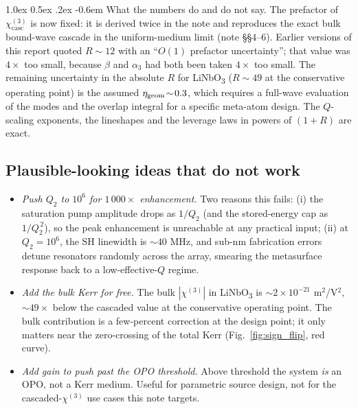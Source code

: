 \documentclass[11pt,a4paper]{article}
\makeatletter
\newcommand{\chithree}{\chi^{(3)}}
\newcommand{\geom}{{\rm geom}}
\renewcommand\paragraph{%
  \@startsection{paragraph}{4}{\z@}%
                {1.0ex \@plus 0.5ex \@minus .2ex}%
                {-0.6em}%
                {\normalfont\itshape}}
\makeatother
\begin{document}
\paragraph{What the numbers do and do not say.}
The prefactor of $\chithree_\text{casc}$ is now fixed: it is derived
twice in the note and reproduces the exact bulk bound-wave cascade in
the uniform-medium limit (note \S\S4--6).  Earlier versions of this
report quoted $R\!\sim\!12$ with an ``$O(1)$ prefactor uncertainty'';
that value was $4\times$ too small, because $\beta$ and $\alpha_3$ had
both been taken $4\times$ too small.  The remaining uncertainty in the
absolute $R$ for LiNbO\textsubscript{3} ($R\!\sim\!49$ at the
conservative operating point) is the assumed $\eta_\geom\!\sim\!0.3$,
which requires a full-wave evaluation of the modes and the overlap
integral for a specific meta-atom design.  The $Q$-scaling exponents,
the lineshapes and the leverage laws in powers of $(1+R)$ are exact.

\subsection{Plausible-looking ideas that do not work}

\begin{itemize}
\item \emph{Push $Q_2$ to $10^{6}$ for $1\,000\times$ enhancement.}
  Two reasons this fails: (i) the saturation pump amplitude drops
  as $1/Q_2$ (and the stored-energy cap as $1/Q_2^{\,2}$), so the
  peak enhancement is unreachable at any practical input; (ii) at
  $Q_2 = 10^{6}$, the SH linewidth is $\sim 40$ MHz, and sub-nm
  fabrication errors detune resonators randomly across the array,
  smearing the metasurface response back to a low-effective-$Q$
  regime.
\item \emph{Add the bulk Kerr for free.} The bulk $|\chithree|$ in
  LiNbO\textsubscript{3} is $\sim 2 \!\times\! 10^{-21}$
  m$^{2}$/V$^{2}$, $\sim 49\times$ below the cascaded value at the
  conservative operating point. The bulk contribution is a few-percent
  correction at the design point; it only matters near the
  zero-crossing of the total Kerr (Fig.~\ref{fig:sign_flip}, red
  curve).
\item \emph{Add gain to push past the OPO threshold.} Above threshold
  the system \emph{is} an OPO, not a Kerr medium. Useful for
  parametric source design, not for the cascaded-$\chithree$ use cases
  this note targets.
\end{itemize}
\end{document}
